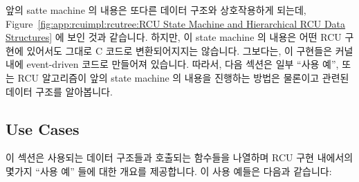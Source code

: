 앞의 satte machine 의 내용은 또다른 데이터 구조와 상호작용하게 되는데,
Figure~\ref{fig:app:rcuimpl:rcutree:RCU State Machine and Hierarchical RCU Data Structures}
에 보인 것과 같습니다.
하지만, 이 state machine 의 내용은 어떤 RCU 구현에 있어서도 그대로 C 코드로
변환되어지지는 않습니다.
그보다는, 이 구현들은 커널 내에 event-driven 코드로 만들어져 있습니다.
따라서, 다음 섹션은 일부 ``사용 예'', 또는 RCU 알고리즘이 앞의 state machine 의
내용을 진행하는 방법은 물론이고 관련된 데이터 구조를 알아봅니다.
\iffalse

The events in the above state schematic interact with different
data structures, as shown in
Figure~\ref{fig:app:rcuimpl:rcutree:RCU State Machine and Hierarchical RCU Data Structures}.
However, the state schematic does not directly translate into C code
for any of the RCU implementations.
Instead, these implementations are coded as an event-driven system within
the kernel.
Therefore, the following section describes some ``use cases'',
or ways in which the RCU algorithm traverses the above state schematic
as well as the relevant data structures.
\fi

\subsection{Use Cases}
\label{app:rcuimpl:rcutree:Use Cases}

이 섹션은 사용되는 데이터 구조들과 호출되는 함수들을 나열하며 RCU 구현 내에서의
몇가지 ``사용 예'' 들에 대한 개요를 제공합니다.
이 사용 예들은 다음과 같습니다:
\iffalse

This section gives an overview of several ``use cases''
within the RCU implementation, listing the data structures touched
and the functions invoked.
The use cases are as follows:
\fi

